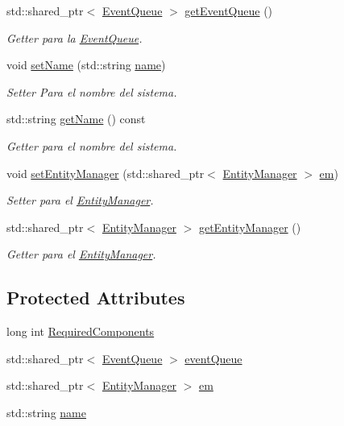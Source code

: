 \begin{DoxyCompactItemize}
std\+::shared\+\_\+ptr$<$ \hyperlink{classant_1_1_event_queue}{Event\+Queue} $>$ \hyperlink{classant_1_1_system_ac3e2bbbdb622276d194ad3a687d8e4f1}{get\+Event\+Queue} ()
\begin{DoxyCompactList}\small\item\em Getter para la \hyperlink{classant_1_1_event_queue}{Event\+Queue}. \end{DoxyCompactList}\item 
void \hyperlink{classant_1_1_system_a231f9fc93b55ee67deb9597ae6be13ba}{set\+Name} (std\+::string \hyperlink{classant_1_1_system_a60b3c00a760a3b4947ab1f1fc534a5b2}{name})
\begin{DoxyCompactList}\small\item\em Setter Para el nombre del sistema. \end{DoxyCompactList}\item 
std\+::string \hyperlink{classant_1_1_system_a52a559b2c3ddbec5c846df1badd7f7f8}{get\+Name} () const 
\begin{DoxyCompactList}\small\item\em Getter para el nombre del sistema. \end{DoxyCompactList}\item 
void \hyperlink{classant_1_1_system_a1f983382d142ea697f1811f7f6f6ab17}{set\+Entity\+Manager} (std\+::shared\+\_\+ptr$<$ \hyperlink{classant_1_1_entity_manager}{Entity\+Manager} $>$ \hyperlink{classant_1_1_system_a5661d872ff769be150bd4e9a9552f6b9}{em})
\begin{DoxyCompactList}\small\item\em Setter para el \hyperlink{classant_1_1_entity_manager}{Entity\+Manager}. \end{DoxyCompactList}\item 
std\+::shared\+\_\+ptr$<$ \hyperlink{classant_1_1_entity_manager}{Entity\+Manager} $>$ \hyperlink{classant_1_1_system_adaad2087de7fc71924cfb5b134014b0a}{get\+Entity\+Manager} ()
\begin{DoxyCompactList}\small\item\em Getter para el \hyperlink{classant_1_1_entity_manager}{Entity\+Manager}. \end{DoxyCompactList}\end{DoxyCompactItemize}
\subsection*{Protected Attributes}
\begin{DoxyCompactItemize}
\item 
long int \hyperlink{classant_1_1_system_a4ef41cfc496e41ac6730f90629524ec7}{Required\+Components}
\item 
std\+::shared\+\_\+ptr$<$ \hyperlink{classant_1_1_event_queue}{Event\+Queue} $>$ \hyperlink{classant_1_1_system_a27e1814e13d161b5ef0e848e3da16d29}{event\+Queue}
\item 
std\+::shared\+\_\+ptr$<$ \hyperlink{classant_1_1_entity_manager}{Entity\+Manager} $>$ \hyperlink{classant_1_1_system_a5661d872ff769be150bd4e9a9552f6b9}{em}
\item 
std\+::string \hyperlink{classant_1_1_system_a60b3c00a760a3b4947ab1f1fc534a5b2}{name}
\end{DoxyCompactItemize}


